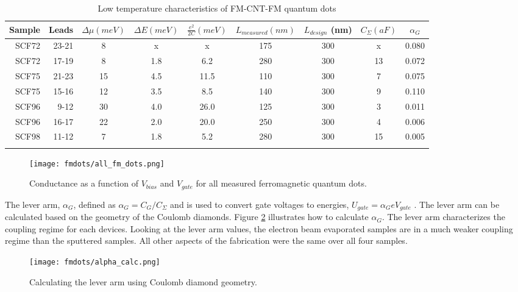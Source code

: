 \begin{table}
    \centering
    \footnotesize
    \begin{tabular}{ r | r | c c c c c c c}
        Sample & Leads & $\Delta \mu (meV)$ & $\Delta E (meV)$ & $\frac{e^2}{2C} (meV)$ & $L_{measured} (nm)$ & $L_{design}$ (nm) & $C_{\Sigma} (aF)$ & $\alpha_{G}$ \\ \hline
        SCF72 & 23-21 & 8  & x   & x    & 175 & 300 & x  & 0.080 \\ 
        SCF72 & 17-19 & 8  & 1.8 & 6.2  & 280 & 300 & 13 & 0.072 \\
        SCF75 & 21-23 & 15 & 4.5 & 11.5 & 110 & 300 & 7  & 0.075 \\
        SCF75 & 15-16 & 12 & 3.5 & 8.5  & 140 & 300 & 9  & 0.110 \\
        SCF96 & 9-12  & 30 & 4.0 & 26.0 & 125 & 300 & 3  & 0.011 \\
        SCF96 & 16-17 & 22 & 2.0 & 20.0 & 250 & 300 & 4  & 0.006 \\
        SCF98 & 11-12 & 7  & 1.8 & 5.2  & 280 & 300 & 15 & 0.005 \\
        \label{table:cold_fm_devices}  
    \end{tabular}
    \caption{Low temperature characteristics of FM-CNT-FM quantum dots}
\end{table}

\begin{figure}
    \centering
    \texttt{[image: fmdots/all\_fm\_dots.png]}
    \caption{Conductance as a function of $V_{bias}$ and $V_{gate}$ for all measured ferromagnetic quantum dots.}
    \label{fig:all_FM_QD}
\end{figure}

The lever arm, $\alpha_{G}$, defined as $\alpha_{G} = C_G/C_{\Sigma}$ and is used to convert gate voltages to energies, $U_{gate} = \alpha_{G}eV_{gate}$ \cite{Ihn2004}. The lever arm can be calculated based on the geometry of the Coulomb diamonds. Figure \ref{fig:alpha_calc} illustrates how to calculate $\alpha_{G}$. The lever arm characterizes the coupling regime for each devices. Looking at the lever arm values, the electron beam evaporated samples are in a much weaker coupling regime than the sputtered samples. All other aspects of the fabrication were the same over all four samples. 

\begin{figure}
    \centering
    \texttt{[image: fmdots/alpha\_calc.png]}
    \caption{Calculating the lever arm using Coulomb diamond geometry.}
    \label{fig:alpha_calc}
\end{figure}

